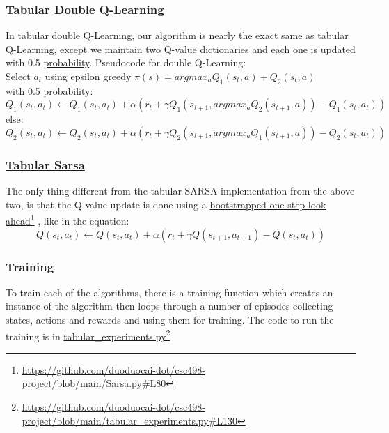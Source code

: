 \documentclass[twoside,11pt]{article}
\newcommand\fnurl[2]{%
  \href{#2}{#1}\footnote{\url{#2}}%
}
\begin{document}
\subsubsection{\href{https://github.com/duoduocai-dot/csc498-project/blob/main/tabular_double_Q_learning.py}{Tabular Double Q-Learning}}
In tabular double Q-Learning, our \href{https://github.com/duoduocai-dot/csc498-project/blob/main/tabular_double_Q_learning.py}{algorithm} is nearly the exact same as tabular Q-Learning, except we maintain \href{https://github.com/duoduocai-dot/csc498-project/blob/main/tabular_double_Q_learning.py#L40}{two} Q-value dictionaries and each one is updated with 0.5 \href{https://github.com/duoduocai-dot/csc498-project/blob/main/tabular_double_Q_learning.py#L91}{probability}.
Pseudocode for double Q-Learning:
\\
Select $a_t$ using epsilon greedy $\pi(s) = argmax_a Q_1(s_t, a)+Q_2(s_t, a)$ 
\\
with 0.5 probability:
\begin{equation}
Q_1(s_t,a_t) \leftarrow Q_1(s_t,a_t) + \alpha (r_t + \gamma Q_1(s_{t+1}, argmax_a Q_2(s_{t+1},a)) - Q_1(s_t,a_t))
\end{equation}
else:
\begin{equation}
Q_2(s_t,a_t) \leftarrow Q_2(s_t,a_t) + \alpha (r_t + \gamma Q_2(s_{t+1}, argmax_a Q_1(s_{t+1},a)) - Q_2(s_t,a_t))
\end{equation}


\subsubsection{\href{https://github.com/duoduocai-dot/csc498-project/blob/main/Sarsa.py}{Tabular Sarsa}}
The only thing different from the tabular SARSA implementation from the above two, is that the Q-value update is done using a \fnurl{bootstrapped one-step look ahead}{https://github.com/duoduocai-dot/csc498-project/blob/main/Sarsa.py\#L80}, like in the equation:
\begin{equation}
Q(s_t,a_t) \leftarrow Q(s_t,a_t) + \alpha (r_t + \gamma Q(s_{t+1},a_{t+1}) - Q(s_t,a_t))
\end{equation}

\subsubsection{Training} 
To train each of the algorithms, there is a training function which creates an instance of the algorithm then loops through a number of episodes collecting states, actions and rewards and using them for training. The code to run the training is in \fnurl{tabular\_experiments.py}{https://github.com/duoduocai-dot/csc498-project/blob/main/tabular_experiments.py\#L130}
\end{document}
